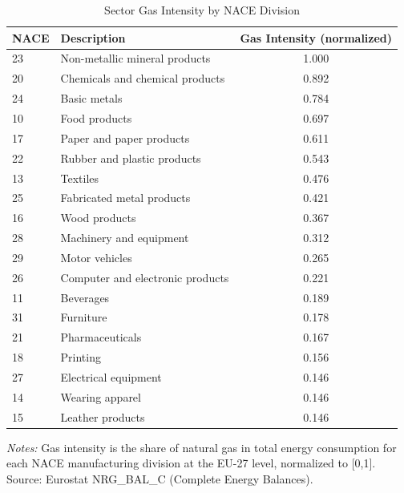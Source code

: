 \documentclass[12pt]{article}
\begin{document}
\begin{table}[htbp]
\centering
\caption{Sector Gas Intensity by NACE Division}
\label{tab:gas_intensity}
\begin{tabular}{llc}
\hline\hline
NACE & Description & Gas Intensity (normalized) \\
\hline
23 & Non-metallic mineral products & 1.000 \\
20 & Chemicals and chemical products & 0.892 \\
24 & Basic metals & 0.784 \\
10 & Food products & 0.697 \\
17 & Paper and paper products & 0.611 \\
22 & Rubber and plastic products & 0.543 \\
13 & Textiles & 0.476 \\
25 & Fabricated metal products & 0.421 \\
16 & Wood products & 0.367 \\
28 & Machinery and equipment & 0.312 \\
29 & Motor vehicles & 0.265 \\
26 & Computer and electronic products & 0.221 \\
11 & Beverages & 0.189 \\
31 & Furniture & 0.178 \\
21 & Pharmaceuticals & 0.167 \\
18 & Printing & 0.156 \\
27 & Electrical equipment & 0.146 \\
14 & Wearing apparel & 0.146 \\
15 & Leather products & 0.146 \\
\hline\hline
\end{tabular}
\begin{minipage}{0.8\textwidth}
\footnotesize
\textit{Notes:} Gas intensity is the share of natural gas in total energy consumption for each NACE manufacturing division at the EU-27 level, normalized to [0,1]. Source: Eurostat NRG\_BAL\_C (Complete Energy Balances).
\end{minipage}
\end{table}
\end{document}
